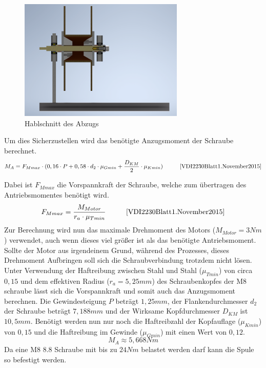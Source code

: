 \begin{figure}[!h]
    \centering
    \includegraphics[width = 0.7\textwidth]{Abbildungen/Spulenaufnahme_0.png}
    \caption{Hablschnitt des Abzugs}
    \label{fig:halbschnitt_Spule}
\end{figure}

Um dies Sicherzustellen wird das benötigte Anzugsmoment der Schraube berechnet.
\begin{equation}\label{eq_MA_DIN}
    M_A = F_{Mmax}\cdot(0,16 \cdot P + 0,58\cdot d_2 \cdot \mu_{Gmin} + \frac{D_{KM}}{2}\cdot \mu_{Kmin}) \hspace{10mm} \cite{VDI2230Blatt1.November2015}
\end{equation}

Dabei ist $F_{Mmax}$ die Vorspannkraft der Schraube, welche zum übertragen des Antriebsmomentes benötigt wird. 
\begin{equation}\label{eq_Fmmax}
     F_{Mmax} = \frac{M_{Motor}}{r_a \cdot \mu_{Tmin}} \hspace{10mm} \cite{VDI2230Blatt1.November2015}
\end{equation}
Zur Berechnung wird nun das maximale Drehmoment des Motors ($M_{Motor} = 3Nm$) verwendet, auch wenn dieses viel größer ist als das benötigte Antriebsmoment. Sollte der Motor aus irgendeinem Grund, während des Prozesses, dieses Drehmoment Aufbringen soll sich die Schraubverbindung trotzdem nicht lösen. Unter Verwendung der Haftreibung zwischen Stahl und Stahl ($\mu_{Tmin}$) von circa $0,15$ und dem effektiven Radius ($r_a = 5,25mm$) des Schraubenkopfes der M8 schraube lässt sich die Vorspannkraft und somit auch das Anzugsmoment berechnen. Die Gewindesteigung $P$ beträgt $1,25mm$, der Flankendurchmesser $d_2$ der Schraube beträgt $7,188mm$ und der Wirksame Kopfdurchmesser $D_{KM}$ ist $10,5mm$. Benötigt werden nun nur noch die Haftreibzahl der Kopfauflage ($\mu_{Kmin}$) von $0,15$ und die Haftreibung im Gewinde ($\mu_{Gmin}$) mit einen Wert von $0,12$.
\begin{equation}\label{eq:solve_MA}
        M_A \approx 5,668 Nm
\end{equation}
Da eine M8 8.8 Schraube mit bis zu $24Nm$ belastet werden darf kann die Spule so befestigt werden.


